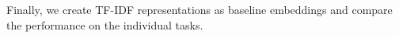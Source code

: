 Finally, we create \ac{TF-IDF} representations as baseline embeddings and compare the performance on the individual tasks. 













 



